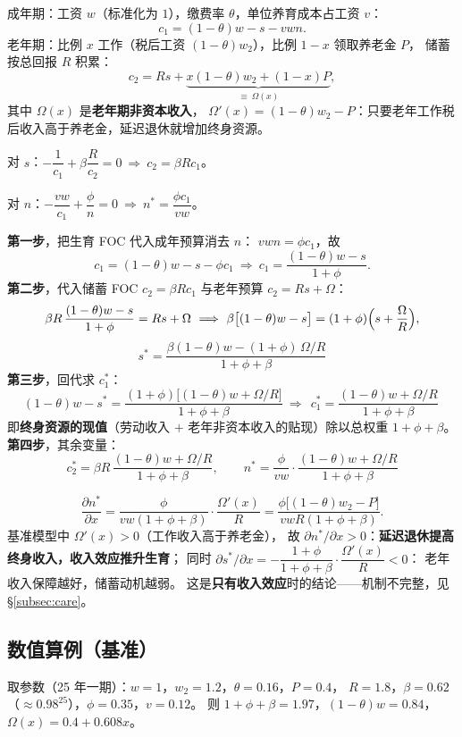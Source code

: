 成年期：工资 $w$（标准化为 $1$），缴费率 $\theta$，单位养育成本占工资 $v$：
\[
c_1=(1-\theta)w-s-vwn.
\]
老年期：比例 $x$ 工作（税后工资 $(1-\theta)w_2$），比例 $1-x$ 领取养老金 $P$，
储蓄按总回报 $R$ 积累：
\[
c_2=Rs+\underbrace{x(1-\theta)w_2+(1-x)P}_{\displaystyle\equiv\ \Omega(x)},
\]
其中 $\Omega(x)$ 是\textbf{老年期非资本收入}，
$\Omega'(x)=(1-\theta)w_2-P$：只要老年工作税后收入高于养老金，延迟退休就增加终身资源。

对 $s$：$-\dfrac{1}{c_1}+\beta\dfrac{R}{c_2}=0\ \Longrightarrow\ c_2=\beta Rc_1$。

对 $n$：$-\dfrac{vw}{c_1}+\dfrac{\phi}{n}=0\ \Longrightarrow\ n^*=\dfrac{\phi c_1}{vw}$。

\textbf{第一步}，把生育 FOC 代入成年预算消去 $n$：
$vwn=\phi c_1$，故
\[
c_1=(1-\theta)w-s-\phi c_1
\ \Longrightarrow\
c_1=\frac{(1-\theta)w-s}{1+\phi}.
\]
\textbf{第二步}，代入储蓄 FOC $c_2=\beta Rc_1$ 与老年预算 $c_2=Rs+\Omega$：
\[
\beta R\,\frac{(1-\theta)w-s}{1+\phi}=Rs+\Omega
\ \Longrightarrow\
\beta\bigl[(1-\theta)w-s\bigr]=(1+\phi)\Bigl(s+\frac{\Omega}{R}\Bigr),
\]
\[
\boxed{\ s^*=\frac{\beta(1-\theta)w-(1+\phi)\,\Omega/R}{1+\phi+\beta}\ }
\]
\textbf{第三步}，回代求 $c_1^*$：
\[
(1-\theta)w-s^*
=\frac{(1+\phi)\bigl[(1-\theta)w+\Omega/R\bigr]}{1+\phi+\beta}
\ \Longrightarrow\
\boxed{\ c_1^*=\frac{(1-\theta)w+\Omega/R}{1+\phi+\beta}\ }
\]
即\textbf{终身资源的现值}（劳动收入 $+$ 老年非资本收入的贴现）除以总权重 $1+\phi+\beta$。
\textbf{第四步}，其余变量：
\[
\boxed{\ c_2^*=\beta R\,\frac{(1-\theta)w+\Omega/R}{1+\phi+\beta},
\qquad
n^*=\frac{\phi}{vw}\cdot\frac{(1-\theta)w+\Omega/R}{1+\phi+\beta}\ }
\]

\notehead{比较静态（符号分析）}
\[
\frac{\partial n^*}{\partial x}
=\frac{\phi}{vw(1+\phi+\beta)}\cdot\frac{\Omega'(x)}{R}
=\frac{\phi\bigl[(1-\theta)w_2-P\bigr]}{vwR(1+\phi+\beta)}.
\]
基准模型中 $\Omega'(x)>0$（工作收入高于养老金），
故 $\partial n^*/\partial x>0$：\textbf{延迟退休提高终身收入，收入效应推升生育}；
同时 $\partial s^*/\partial x=-\dfrac{1+\phi}{1+\phi+\beta}\cdot\dfrac{\Omega'(x)}{R}<0$：
老年收入保障越好，储蓄动机越弱。
这是\textbf{只有收入效应}时的结论——机制不完整，见 §\ref{subsec:care}。

\subsection{数值算例（基准）}

取参数（25 年一期）：$w=1$，$w_2=1.2$，$\theta=0.16$，$P=0.4$，
$R=1.8$，$\beta=0.62$（$\approx0.98^{25}$），$\phi=0.35$，$v=0.12$。
则 $1+\phi+\beta=1.97$，$(1-\theta)w=0.84$，
$\Omega(x)=0.4+0.608x$。

